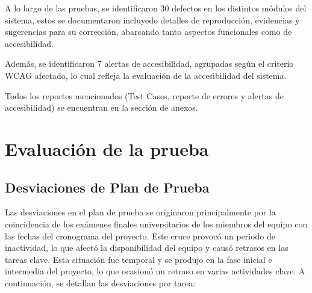 \documentclass[stu, 12pt, letterpaper, donotrepeattitle, floatsintext, natbib]{apa7}
\begin{document}
A lo largo de las pruebas, se identificaron 30 defectos en los distintos módulos del sistema, estos se documentaron incluyedo detalles de reproducción, evidencias y sugerencias para su corrección, abarcando tanto aspectos funcionales como de accesibilidad. 

Además, se identificaron 7 alertas de accesibilidad, agrupadas según el criterio WCAG afectado, lo cual refleja la evaluación de la accesibilidad del sistema. 

\noindent Todos los reportes mencionados (Test Cases, reporte de errores y alertas de accesibilidad) se encuentran en la sección de anexos.

\section{\large Evaluación de la prueba}

\subsection{Desviaciones de Plan de Prueba}

Las desviaciones en el plan de prueba se originaron principalmente por la coincidencia de los exámenes finales universitarios de los miembros del equipo con las fechas del cronograma del proyecto. Este cruce provocó un periodo de inactividad, lo que afectó la disponibilidad del equipo y causó retrasos en las tareas clave. 
Esta situación fue temporal y se produjo en la fase inicial e intermedia del proyecto, lo que ocasionó un retraso en varias actividades clave.
A continuación, se detallan las desviaciones por tarea:
\end{document}

